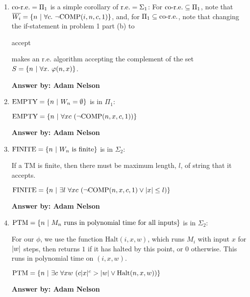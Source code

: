 \documentclass[12pt]{article}
\begin{document}
\begin{enumerate}
    {\bf Answer by: Adam Nelson}

  \item $\text{co-r.e.} = \Pi_1$ is a simple corollary of $\text{r.e.} = \Sigma_1$: For
    $\text{co-r.e.} \subseteq \Pi_1$, note that $\overline{W_i} = \left\{ n ~|~ \forall c.~\lnot\text{COMP}(i,n,c,1) \right\}$, and, for $\Pi_1 \subseteq \text{co-r.e.}$,
    note that changing the if-statement in problem 1 part (b) to
    \begin{algorithmic}
        \STATE accept
      \ENDIF
    \end{algorithmic}
    makes an r.e. algorithm accepting the complement of the set
    $S = \left\{ n ~|~ \forall x.~\varphi(n, x) \right\}$.

    {\bf Answer by: Adam Nelson}

  \item $\text{EMPTY} = \left\{ n ~|~ W_n = \emptyset \right\}$ is in $\Pi_1$:

    $\text{EMPTY} = \left\{ n ~|~ \forall x c~(\lnot\text{COMP}(n,x,c,1)) \right\}$

    {\bf Answer by: Adam Nelson}

  \item $\text{FINITE} = \left\{ n ~|~ W_n~\text{is finite} \right\}$ is in $\Sigma_2$:

    If a TM is finite, then there must be maximum length, $l$, of string that
    it accepts.

    $\text{FINITE} = \left\{ n ~|~ \exists l~\forall x c~(\lnot\text{COMP}(n,x,c,1)
      \lor \left|x\right| \le l) \right\}$

    {\bf Answer by: Adam Nelson}

  \item $\text{PTM} = \left\{ n ~|~ M_n~\text{runs in polynomial time for all inputs} \right\}$
    is in $\Sigma_2$:

    For our $\phi$, we use the function $\text{Halt}(i,x,w)$, which runs $M_i$
    with input $x$ for $\vert w \vert$ steps, then returns $1$ if it has halted by this
    point, or $0$ otherwise. This runs in polynomial time on $(i,x,w)$.

    $\text{PTM} = \left\{ n ~|~ \exists c~\forall x w~(c\vert x \vert^c >  \vert w \vert
      \lor \text{Halt}(n,x,w)) \right\}$

    {\bf Answer by: Adam Nelson}

\end{enumerate}
\end{document}
